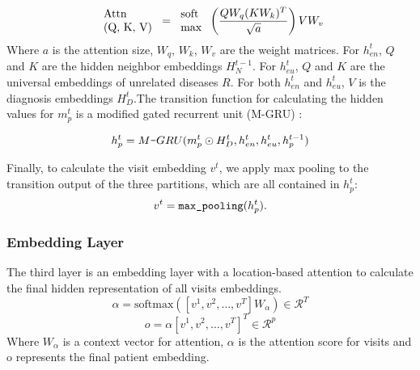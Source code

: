 \documentclass[11pt,a4paper]{article}
\begin{document}
\begin{equation}
\begin{tabular}{l}
Attn \\ (Q, K, V) 
\end{tabular}
=
\begin{tabular}{l}
  soft \\
  max
\end{tabular}\left(\frac{QW_q(KW_k)^T}{\sqrt{a}}\right)VW_v 
\end{equation}
\normalsize
Where $a$ is the attention size, $W_q$, $W_k$, $W_v$ are the weight matrices.
For $h_{en}^t$, $Q$ and $K$ are the hidden neighbor embeddings $H_N^{t-1}$.
For $h_{eu}^t$, $Q$ and $K$ are the universal embeddings of unrelated diseases $R$.
For both $h_{en}^t$ and $h_{eu}^t$, $V$ is the diagnosis embeddings $H^{t}_D$.
​
The transition function for calculating the hidden values for $m_p^t$ is a modified 
gated recurrent unit (M-GRU) \cite{gru}:

\begin{equation}
  h_p^t = {M\verb|-|GRU}(m_p^t \odot H_D^t , h_{en}^t, h_{eu}^t, h_p^{t-1})
\end{equation}

Finally, to calculate the visit embedding $v^t$, we apply max pooling to the 
transition output of the three partitions, which are all contained in $h_p^t$:
\begin{equation}
  v^t = \verb|max_pooling|(h_p^t).
\end{equation}

\subsubsection{Embedding Layer}
The third layer is an embedding layer with a location-based attention to calculate the final hidden representation of all visits embeddings.
\begin{equation}
  \alpha=\textrm{softmax}([v^1,v^2,\dots, v^T]W_\alpha)\in \mathcal{R}^T
\end{equation}
\begin{equation}
  o=\alpha[v^1,v^2,\dots, v^T]^T\in\mathcal{R}^p
\end{equation}
Where $W_\alpha$ is a context vector for attention, $\alpha$ is the attention score for visits and o represents the final patient embedding.
\end{document}
